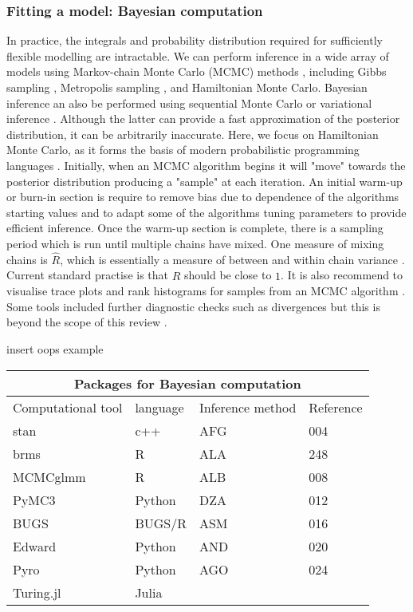 \documentclass[12pt,english]{article}
\begin{document}
\subsubsection{Fitting a model: Bayesian computation}
In practice, the integrals and probability distribution required for sufficiently flexible modelling are intractable. We can perform inference in a wide array of models using Markov-chain Monte Carlo (MCMC) methods \citep{Gilks::1995, Brooks::2011}, including Gibbs sampling \citep{Smith::1993, Gelfand::2000}, Metropolis sampling \citep{Robert::1999}, and Hamiltonian Monte Carlo\citep{Hoffman::2014}. Bayesian inference an also be performed using sequential Monte Carlo \citep{Del::2006} or variational inference \citep{Blei::2017}. Although the latter can provide a fast approximation of the posterior distribution, it can be arbitrarily inaccurate. Here, we focus on Hamiltonian Monte Carlo, as it forms the basis of modern probabilistic programming languages \citep{Carpenter::2017}. Initially, when an MCMC algorithm begins it will "move" towards the posterior distribution producing a "sample" at each iteration. An initial warm-up or burn-in section is require to remove bias due to dependence of the algorithms starting values and to adapt some of the algorithms tuning parameters to provide efficient inference. Once the warm-up section is complete, there is a sampling period which is run until multiple chains have mixed. One measure of mixing chains is $\hat{R}$, which is essentially a measure of between and within chain variance \citep{Vehtari::2019}. Current standard practise is that $\hat{R}$ should be close to $1$. It is also recommend to visualise trace plots and rank histograms for samples from an MCMC algorithm \citep{Gabry::2019}. Some tools included further diagnostic checks such as divergences but this is beyond the scope of this review \citep{Betancourt::2017}.

insert oops example

\begin{table}[ht]
	\centering
	\begin{tabular}{ |p{3cm}||p{3cm}|p{3cm}|p{3cm}|  }
		\hline
		\multicolumn{4}{|c|}{Packages for Bayesian computation} \\
		\hline
		Computational tool & language & Inference method & Reference\\
		\hline
		stan   & c++   &AFG&   004\\
		brms &   R  & ALA   &248\\
		MCMCglmm & R & ALB&  008\\
		PyMC3    & Python & DZA&  012\\
		BUGS &   BUGS/R  & ASM&016\\
		Edward&  Python  & AND   &020\\
		Pyro & Python & AGO&024\\
		Turing.jl & Julia &&\\
		\hline
	\end{tabular}
\end{table}
\end{document}
